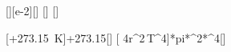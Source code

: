 [\centi\meter][e-2][\meter]
[\degreeCelsius]
[\Wpqmkv]

[\vartheta+\SI{273.15}{\kelvin}]{\tKX+273.15}[\kelvin]
[\varepsilon\,\sigma\,4\pi r^2\,T^4]{\eAlX*{}*pi*\rKX^2*\TKX^4}[\watt]
